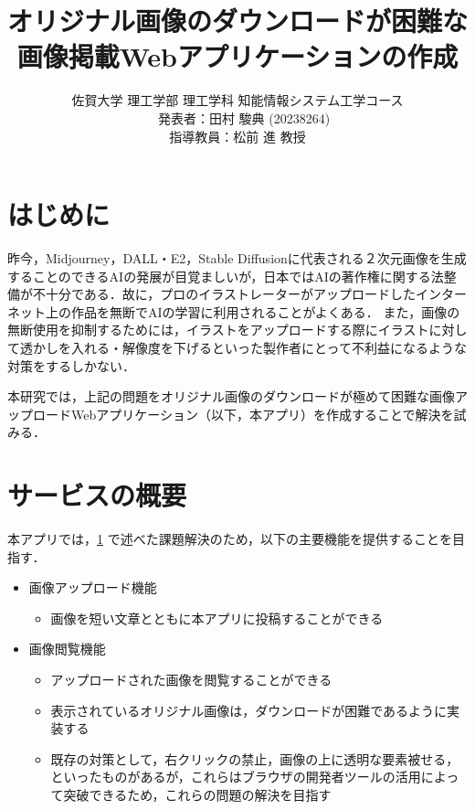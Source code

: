 ﻿\documentclass[twocolumn,a4j]{jarticle}
\title{
  オリジナル画像のダウンロードが困難な\\画像掲載Webアプリケーションの作成
}
\author{
  佐賀大学 理工学部 理工学科 知能情報システム工学コース\\
  　発表者：田村 駿典 (20238264)\\
  指導教員：松前 進 教授
}
\begin{document}
\date{\empty}
\maketitle
\thispagestyle{empty}

\section{はじめに}\label{sec:sec1}

昨今，Midjourney，DALL・E2，Stable Diffusionに代表される２次元画像を生成することのできるAIの発展が目覚ましいが，日本ではAIの著作権に関する法整備が不十分である．故に，プロのイラストレーターがアップロードしたインターネット上の作品を無断でAIの学習に利用されることがよくある\cite{nhk}．
また，画像の無断使用を抑制するためには，イラストをアップロードする際にイラストに対して透かしを入れる・解像度を下げるといった製作者にとって不利益になるような対策をするしかない．\par
本研究では，上記の問題をオリジナル画像のダウンロードが極めて困難な画像アップロードWebアプリケーション（以下，本アプリ）を作成することで解決を試みる．



\section{サービスの概要}
本アプリでは，\ref{sec:sec1} で述べた課題解決のため，以下の主要機能を提供することを目指す．
\begin{itemize}
  \item 画像アップロード機能
        \setlength{\parskip}{0cm}
        \begin{itemize}
          \item 画像を短い文章とともに本アプリに投稿することができる
        \end{itemize}
  \item 画像閲覧機能
        \begin{itemize}
          \item アップロードされた画像を閲覧することができる
          \item 表示されているオリジナル画像は，ダウンロードが困難であるように実装する
          \item 既存の対策として，右クリックの禁止，画像の上に透明な要素被せる，といったものがあるが，これらはブラウザの開発者ツールの活用によって突破できるため，これらの問題の解決を目指す
        \end{itemize}
\end{itemize}
\end{document}
